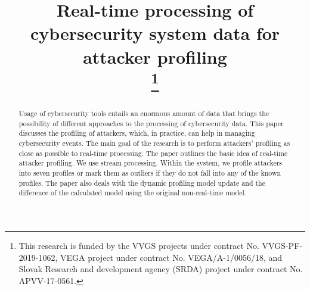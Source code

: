 \documentclass[conference, a4paper]{IEEEtran}
\begin{document}

\title{Real-time processing of cybersecurity system data for attacker profiling\\
\thanks{This research is funded by the VVGS projects under contract No. VVGS-PF-2019-1062, VEGA project under contract No. VEGA/A-1/0056/18, and Slovak Research and development agency (SRDA) project under contract No. APVV-17-0561.}
}

\author{
\and
{}
\and
{}
\and
{}
}

\maketitle

\begin{abstract}
Usage of cybersecurity tools entails an enormous amount of data that brings the possibility of different approaches to the processing of cybersecurity data. This paper discusses the profiling of attackers, which, in practice, can help in managing cybersecurity events. The main goal of the research is to perform attackers' profiling as close as possible to real-time processing. The paper outlines the basic idea of real-time attacker profiling. We use stream processing. Within the system, we profile attackers into seven profiles or mark them as outliers if they do not fall into any of the known profiles. The paper also deals with the dynamic profiling model update and the difference of the calculated model using the original non-real-time model.
\end{abstract}
\end{document}
